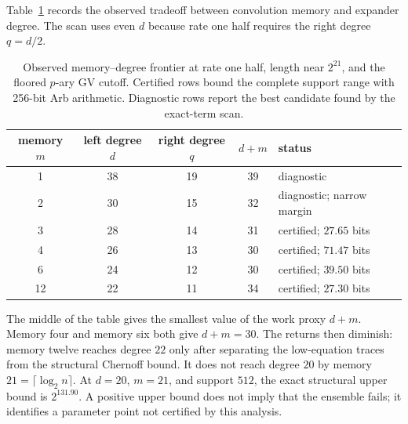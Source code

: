 Table~\ref{tab:prime-ec-memory-degree-frontier} records the observed tradeoff
between convolution memory and expander degree.  The scan uses even $d$
because rate one half requires the right degree $q=d/2$.
\begin{table}[H]
\centering
\caption{Observed memory--degree frontier at rate one half, length near
$2^{21}$, and the floored $p$-ary GV cutoff.  Certified rows bound the
complete support range with 256-bit Arb arithmetic.  Diagnostic rows report
the best candidate found by the exact-term scan.}
\label{tab:prime-ec-memory-degree-frontier}
\begin{tabular}{c|c|c|c|l}
memory $m$ & left degree $d$ & right degree $q$ & $d+m$ & status \\ \hline
1  & 38 & 19 & 39 & diagnostic \\
2  & 30 & 15 & 32 & diagnostic; narrow margin \\
3  & 28 & 14 & 31 & certified; $27.65$ bits \\
4  & 26 & 13 & 30 & certified; $71.47$ bits \\
6  & 24 & 12 & 30 & certified; $39.50$ bits \\
12 & 22 & 11 & 34 & certified; $27.30$ bits
\end{tabular}
\end{table}

The middle of the table gives the smallest value of the work proxy $d+m$.
Memory four and memory six both give $d+m=30$.  The returns then diminish:
memory twelve reaches degree $22$ only after separating the low-equation
traces from the structural Chernoff bound.
It does not reach degree $20$ by memory $21=\lceil\log_2 n\rceil$.  At
$d=20$, $m=21$, and support $512$, the exact structural upper bound is
$2^{131.90}$.  A positive upper bound does not imply that the ensemble
fails; it identifies a parameter point not certified by this analysis.
